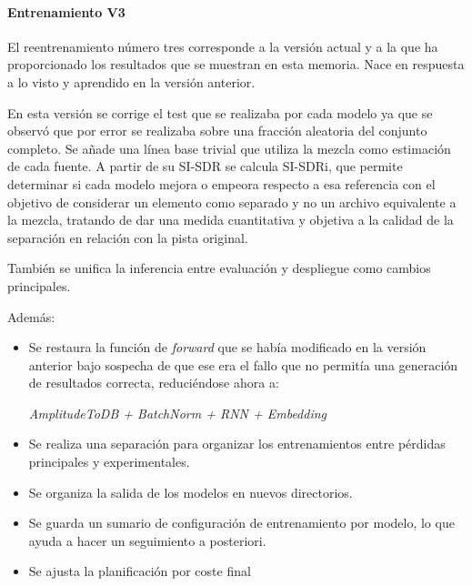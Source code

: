 \paragraph{Entrenamiento V3}

El reentrenamiento número tres corresponde a la versión actual y a la que ha proporcionado los resultados que se muestran en esta memoria. Nace en respuesta a lo visto y aprendido en la versión anterior.

En esta versión se corrige el test que se realizaba por cada modelo ya que se observó que por error se realizaba sobre una fracción aleatoria del conjunto completo. Se añade una línea base trivial que utiliza la mezcla como estimación de cada fuente. A partir de su SI-SDR se calcula SI-SDRi, que permite determinar si cada modelo mejora o empeora respecto a esa referencia con el objetivo de considerar un elemento como separado y no un archivo equivalente a la mezcla, tratando de dar una medida cuantitativa y objetiva a la calidad de la separación en relación con la pista original.

También se unifica la inferencia entre evaluación y despliegue como cambios principales.

Además: 

\begin{itemize}
    \item Se restaura la función de \textit{forward} que se había modificado en la versión anterior bajo sospecha de que ese era el fallo que no permitía una generación de resultados correcta, reduciéndose ahora a: 
    \begin{center}
        \textit{AmplitudeToDB + BatchNorm + RNN + Embedding}
    \end{center}
    \item Se realiza una separación para organizar los entrenamientos entre pérdidas principales y experimentales.
    \item Se organiza la salida de los modelos en nuevos directorios.
    \item Se guarda un sumario de configuración de entrenamiento por modelo, lo que ayuda a hacer un seguimiento a posteriori.
    \item Se ajusta la planificación por coste final
\end{itemize}